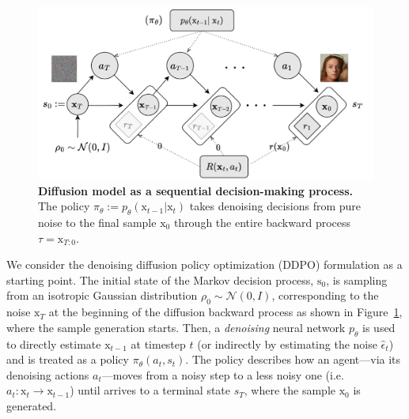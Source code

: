 \begin{figure}[ht]
  \centering
  \includegraphics[scale=0.85]{img/results/diffusion-model-MDP.png}
  \vspace{-4pt}  %
    \captionsetup{width=\textwidth} %
    \caption{\textbf{Diffusion model as a sequential decision-making process.} The policy $\pi_{\theta}:=p_{\theta}(\mathrm{x}_{t-1} | \mathrm{x}_{t})$  takes denoising decisions from pure noise to the final sample $\mathrm{x}_0$ through the entire backward process $\tau=\mathrm{x}_{T:0}$.}
  \label{fig:diffusion-model-mdp}
\end{figure}

We consider the denoising diffusion policy optimization (DDPO) formulation \citep{black2023training} as a starting point. The initial state of the Markov decision process,
$\mathrm{s}_{0}$, is sampling from an isotropic
Gaussian distribution 
$\rho_{0}\sim\mathcal{N}(0, I)$, corresponding to the
noise $\mathrm{x}_{T}$ at the beginning of the
diffusion backward process as shown in Figure~\ref{fig:diffusion-model-mdp}, where the sample
generation starts. 
Then, a \textit{denoising} neural network $p_{\theta}$
is used to directly estimate $\mathrm{x}_{t-1}$ at
timestep $t$ (or indirectly by
estimating the noise $\hat{\epsilon}_{t}$) and is
treated as a policy $\pi_{\theta}(a_{t}, s_{t})$. The policy describes how an agent---via its denoising actions $a_{t}$---moves from a noisy
step to a less noisy one (i.e. 
$a_t: \mathrm{x}_{t} \rightarrow \mathrm{x}_{t-1}$) until arrives to a terminal state $s_T$, where the sample $\mathrm{x}_{0}$ is generated. \\

